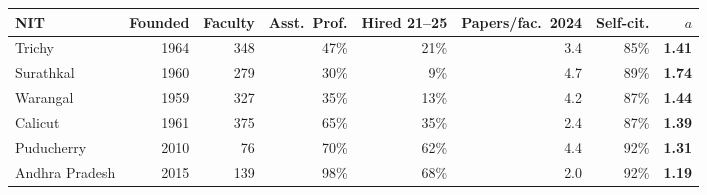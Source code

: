 \begin{tabular}{@{}lrrrrrrr@{}}
\toprule
NIT & Founded & Faculty & Asst.\ Prof. & Hired 21--25 & Papers/fac.\ 2024 & Self-cit. & $a$ \\
\midrule
Trichy & 1964 & 348 & 47\% & 21\% & 3.4 & 85\% & \textbf{1.41} \\
Surathkal & 1960 & 279 & 30\% & 9\% & 4.7 & 89\% & \textbf{1.74} \\
Warangal & 1959 & 327 & 35\% & 13\% & 4.2 & 87\% & \textbf{1.44} \\
Calicut & 1961 & 375 & 65\% & 35\% & 2.4 & 87\% & \textbf{1.39} \\
Puducherry & 2010 & 76 & 70\% & 62\% & 4.4 & 92\% & \textbf{1.31} \\
Andhra Pradesh & 2015 & 139 & 98\% & 68\% & 2.0 & 92\% & \textbf{1.19} \\
\bottomrule
\end{tabular}
